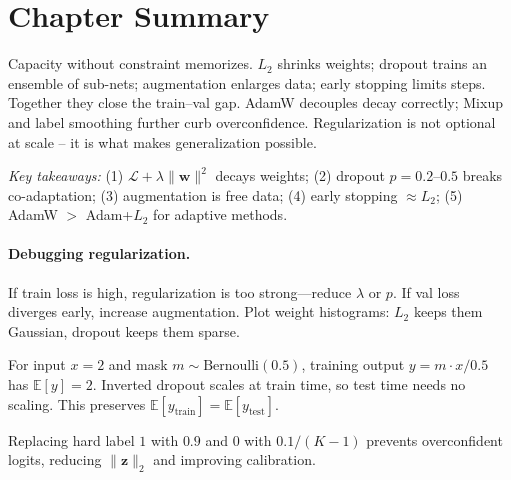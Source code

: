 \section{Chapter Summary}
Capacity without constraint memorizes. $L_2$ shrinks weights; dropout trains an
ensemble of sub-nets; augmentation enlarges data; early stopping limits steps.
Together they close the train--val gap. AdamW decouples decay correctly; Mixup
and label smoothing further curb overconfidence. Regularization is not optional
at scale -- it is what makes generalization possible.

\smallskip
\noindent\textit{Key takeaways:} (1) $\mathcal{L}+\lambda\|\mathbf{w}\|^2$
decays weights; (2) dropout $p=0.2$--$0.5$ breaks co-adaptation;
(3) augmentation is free data; (4) early stopping $\approx L_2$;
(5) AdamW $>$ Adam+$L_2$ for adaptive methods.

\paragraph{Debugging regularization.} If train loss is high, regularization is too strong—reduce $\lambda$ or $p$. If val loss diverges early, increase augmentation. Plot weight histograms: $L_2$ keeps them Gaussian, dropout keeps them sparse.

\begin{example} For input $x=2$ and mask $m\sim\text{Bernoulli}(0.5)$, training output $y=m\cdot x/0.5$ has $\mathbb{E}[y]=2$. Inverted dropout scales at train time, so test time needs no scaling. This preserves $\mathbb{E}[y_{\text{train}}]=\mathbb{E}[y_{\text{test}}]$.
\end{example}
\begin{remark} Replacing hard label $1$ with $0.9$ and $0$ with $0.1/(K-1)$ prevents overconfident logits, reducing $\|\mathbf{z}\|_2$ and improving calibration.
\end{remark}

